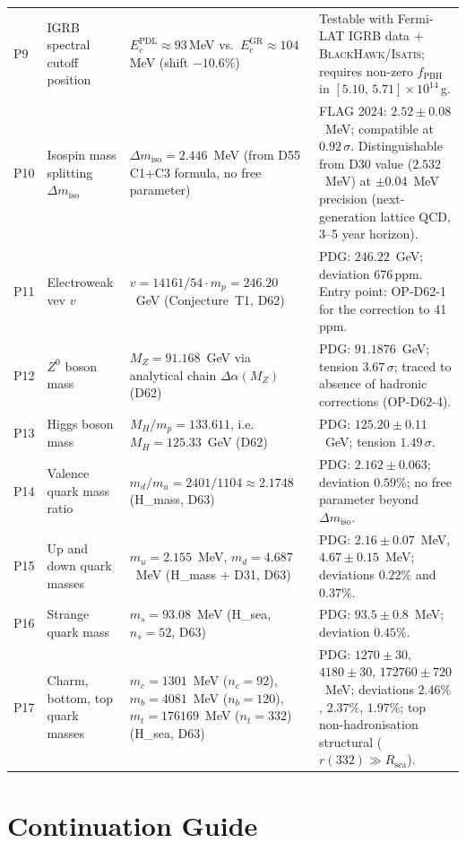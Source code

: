 \documentclass[11pt,a4paper]{article}
\theoremstyle{plain}
\theoremstyle{definition}
\theoremstyle{remark}
\begin{document}
\begin{longtable}{L{0.5cm}L{3.2cm}L{5.2cm}L{4.2cm}}
P9 & IGRB spectral cutoff position & $E_c^{\mathrm{PDL}} \approx 93$\,MeV vs.\ $E_c^{\mathrm{GR}} \approx 104$\,MeV (shift $-10.6\%$) & Testable with Fermi-LAT IGRB data + \textsc{BlackHawk}/\textsc{Isatis}; requires non-zero $f_{\mathrm{PBH}}$ in $[5.10,\,5.71]\times10^{14}$\,g.\\[0.4em]
P10 & Isospin mass splitting $\Delta m_{\mathrm{iso}}$ & $\Delta m_{\mathrm{iso}} = 2.446$~MeV (from D55 C1+C3 formula, no free parameter) & FLAG 2024: $2.52 \pm 0.08$~MeV; compatible at $0.92\,\sigma$. Distinguishable from D30 value ($2.532$~MeV) at $\pm 0.04$~MeV precision (next-generation lattice QCD, 3--5 year horizon).\\[0.4em]
P11 & Electroweak vev $v$ & $v = 14161/54\cdot m_p = 246.20$~GeV (Conjecture~T1, D62) & PDG: $246.22$~GeV; deviation 676\,ppm. Entry point: OP-D62-1 for the correction to 41\,ppm.\\[0.4em]
P12 & $Z^0$ boson mass & $M_Z = 91.168$~GeV via analytical chain $\Delta\alpha(M_Z)$ (D62) & PDG: $91.1876$~GeV; tension $3.67\,\sigma$; traced to absence of hadronic corrections (OP-D62-4).\\[0.4em]
P13 & Higgs boson mass & $M_H/m_p = 133.611$, i.e.\ $M_H = 125.33$~GeV (D62) & PDG: $125.20 \pm 0.11$~GeV; tension $1.49\,\sigma$.\\[0.4em]
P14 & Valence quark mass ratio & $m_d/m_u = 2401/1104 \approx 2.1748$ (H\_mass, D63) & PDG: $2.162 \pm 0.063$; deviation $0.59\%$; no free parameter beyond $\Delta m_{\mathrm{iso}}$.\\[0.4em]
P15 & Up and down quark masses & $m_u = 2.155$~MeV, $m_d = 4.687$~MeV (H\_mass + D31, D63) & PDG: $2.16 \pm 0.07$~MeV, $4.67 \pm 0.15$~MeV; deviations $0.22\%$ and $0.37\%$.\\[0.4em]
P16 & Strange quark mass & $m_s = 93.08$~MeV (H\_sea, $n_s=52$, D63) & PDG: $93.5 \pm 0.8$~MeV; deviation $0.45\%$.\\[0.4em]
P17 & Charm, bottom, top quark masses & $m_c = 1301$~MeV ($n_c=92$), $m_b = 4081$~MeV ($n_b=120$), $m_t = 176169$~MeV ($n_t=332$) (H\_sea, D63) & PDG: $1270 \pm 30$, $4180 \pm 30$, $172760 \pm 720$~MeV; deviations $2.46\%$, $2.37\%$, $1.97\%$; top non-hadronisation structural ($r(332) \gg R_{\mathrm{sea}}$).\\[0.4em]
\end{longtable}

\section{Continuation Guide}
\label{sec:continuation}
\end{document}
